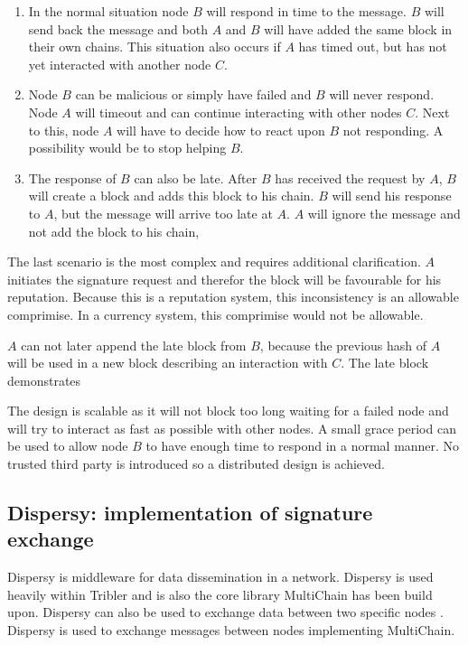 \begin{enumerate}
\item
In the normal situation node $B$ will respond in time to the message.
$B$ will send back the message
and both $A$ and $B$ will have added the same block in their own chains.
This situation also occurs if $A$ has timed out,
but has not yet interacted with another node $C$.

\item
Node $B$ can be malicious or simply have failed and $B$ will never respond.
Node $A$ will timeout and can continue interacting with other nodes $C$.
Next to this, node $A$ will have to decide how to react upon $B$ not responding.
A possibility would be to stop helping $B$.

\item
The response of $B$ can also be late.
After $B$ has received the request by $A$,
$B$ will create a block and adds this block to his chain.
$B$ will send his response to $A$,
but the message will arrive too late at $A$.
$A$ will ignore the message and not add the block to his chain,
\end{enumerate}

The last scenario is the most complex and requires additional clarification.
$A$ initiates the signature request and therefor the block will be favourable for his reputation.
Because this is a reputation system, this inconsistency is an allowable comprimise.
In a currency system, this comprimise would not be allowable.

$A$ can not later append the late block from $B$,
because the previous hash of $A$ will be used in a new block describing an interaction with $C$.
The late block demonstrates 

The design is scalable as it will not block too long waiting for a failed node 
and will try to interact as fast as possible with other nodes.
A small grace period can be used to allow node $B$ to have enough time to respond in a normal manner.
No trusted third party is introduced so a distributed design is achieved.

\subsection{Dispersy: implementation of signature exchange}
Dispersy is middleware for data dissemination in a network.
Dispersy is used heavily within Tribler
and is also the core library MultiChain has been build upon.
Dispersy can also be used to exchange data between two specific nodes \cite{zeilemaker-dispersy}.
Dispersy is used to exchange messages between nodes implementing MultiChain.

